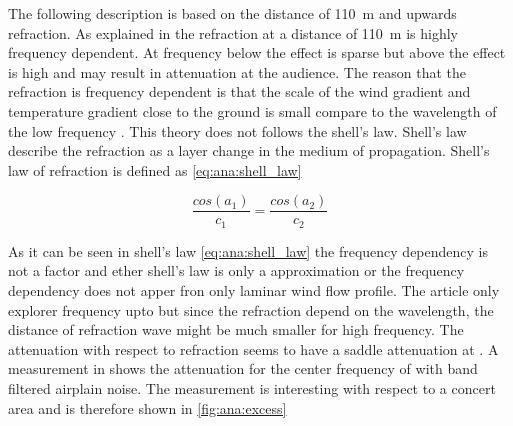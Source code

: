 

The following description is based on the distance of \SI{110}{\meter} and upwards refraction. As explained in \citep{review_of_sound} the refraction at a distance of \SI{110}{\meter} is highly frequency dependent. At frequency below  the effect is sparse but above the effect is high and may result in  attenuation at the audience. The reason that the refraction is frequency dependent is that the scale of the wind gradient and temperature gradient close to the ground is small compare to the wavelength of the low frequency \citep{review_of_sound}. This theory does not follows the shell's law. Shell's law describe the refraction as a layer change in the medium of propagation. Shell's law of refraction is defined as \autoref{eq:ana:shell_law}

\begin{equation}\label{eq:ana:shell_law}
\frac{cos(a_1)}{c_1} = \frac{cos(a_2)}{c_2}
\end{equation}

\startexplain
{}
\stopexplain

As it can be seen in shell's law \autoref{eq:ana:shell_law} the frequency dependency is not a factor and ether shell's law is only a approximation or the frequency dependency does not apper fron only laminar wind flow profile. The article \citep{review_of_sound} only explorer frequency upto  but since the refraction depend on the wavelength, the distance of refraction wave might be much smaller for high frequency. The attenuation with respect to refraction seems to have a saddle attenuation at . A measurement in \citep{review_of_sound} shows the attenuation for the center frequency of  with  band filtered airplain noise. The measurement is interesting with respect to a concert area and is therefore shown in \autoref{fig:ana:excess} 



